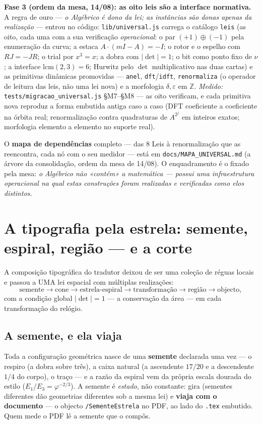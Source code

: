 \documentclass[11pt,a4paper]{article}
\newcommand{\code}[1]{\texttt{\small #1}}
\begin{document}
\medskip
\noindent\textbf{Fase 3 (ordem da mesa, 14/08): as oito leis são a
interface normativa.} A regra de ouro --- \emph{o Algébrico é dono da
lei; as instâncias são donas apenas da realização} --- entrou no
código: \code{lib/universal.js} carrega o catálogo \code{leis} (as
oito, cada uma com a sua verificação \emph{operacional}: o par
$(+1)\oplus(-1)$ pela enumeração da curva; a estaca $A\cdot(mI{-}A)=-I$;
o rotor e o espelho com $RJ=-JR$; o trial por $x^{3}=x$; a dobra com
$|\det|=1$; o bit como ponto fixo de $\nu$; a interface
$\mathrm{lcm}(2,3)=6$; Hurwitz pelo $\det$ multiplicativo nas duas
cartas) e as primitivas dinâmicas promovidas --- \code{anel},
\code{dft}/\code{idft}, \code{renormaliza} (o operador de leitura das
leis, não uma lei nova) e a morfologia $\delta,\varepsilon$ em
$\mathbb{Z}$. \emph{Medido:} \code{tests/migracao\_universal.js}
\S M7--\S M8 --- as oito verificam, e cada primitiva nova reproduz a
forma embutida antiga caso a caso (DFT coeficiente a coeficiente na
órbita real; renormalização contra quadraturas de $A^{2^{j}}$ em
inteiros exatos; morfologia elemento a elemento no suporte real).

\smallskip
\noindent O \textbf{mapa de dependências} completo --- das $8$ Leis à
renormalização que as reencontra, cada nó com o seu medidor --- está em
\code{docs/MAPA\_UNIVERSAL.md} (a árvore da consolidação, ordem da mesa
de 14/08). O enquadramento é o fixado pela mesa: \emph{o Algébrico não
«contém» a matemática --- possui uma infraestrutura operacional na qual
estas construções foram realizadas e verificadas como elos distintos.}

\section{A tipografia pela estrela: semente, espiral, região --- e a corte}\label{sec:espiral}

\noindent A composição tipográfica do tradutor deixou de ser uma coleção de réguas locais e
passou a UMA lei espacial com múltiplas realizações:
\[
  \text{semente}\to\text{cone}\to\text{estrela-espiral}\to\text{transformação}
  \to\text{região}\to\text{objecto},
\]
com a condição global $|\det|=1$ --- a conservação da área --- em cada transformação do relógio.

\subsection*{A semente, e ela viaja}

Toda a configuração geométrica nasce de uma \textbf{semente} declarada uma vez --- o respiro (a
dobra sobre três), a caixa natural (a ascendente $17/20$ e a descendente $1/4$ do corpo), o traço
--- e a razão da espiral vem da própria escala dourada do estilo ($E_1/E_3=\varphi^{-2/3}$). A
semente é \emph{estado}, não constante: gira (sementes diferentes dão geometrias diferentes sob a
mesma lei) e \textbf{viaja com o documento} --- o objecto \code{/SementeEstrela} no PDF, ao lado
do \code{.tex} embutido. Quem mede o PDF lê a semente que o compôs.
\end{document}
